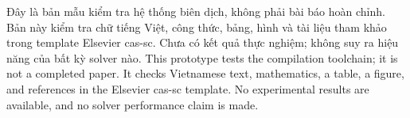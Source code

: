 \ifVietnamese
Đây là bản mẫu kiểm tra hệ thống biên dịch, không phải bài báo hoàn chỉnh.
Bản này kiểm tra chữ tiếng Việt, công thức, bảng, hình và tài liệu tham khảo
trong template Elsevier cas-sc. Chưa có kết quả thực nghiệm; không suy ra
hiệu năng của bất kỳ solver nào.
\else
This prototype tests the compilation toolchain; it is not a completed paper.
It checks Vietnamese text, mathematics, a table, a figure, and references in
the Elsevier cas-sc template. No experimental results are available, and no
solver performance claim is made.
\fi
